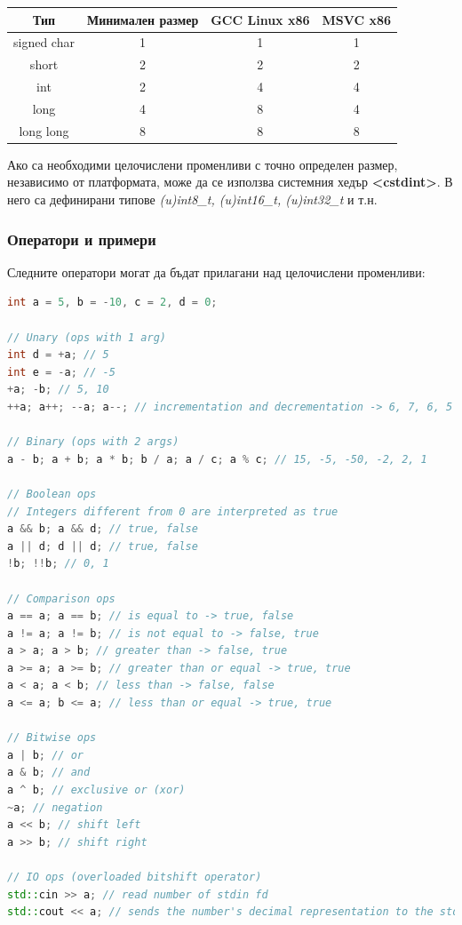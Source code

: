\documentclass[fleqn,12pt]{article}
\begin{document}
\begin{tabular}{ |c|c|c|c| } 
\hline
Тип & Минимален размер & GCC Linux x86 & MSVC x86 \\ 
\hline
signed char & 1 & 1 & 1 \\ 
\hline
short & 2 & 2 & 2 \\ 
\hline
int & 2 & 4 & 4 \\ 
\hline
long & 4 & 8 & 4 \\ 
\hline
long long & 8 & 8 & 8 \\ 
\hline
\end{tabular}

Ако са необходими целочислени променливи с точно определен размер, независимо от платформата, може да се използва системния хедър \textbf{<cstdint>}. 
В него са дефинирани типове \textit{(u)int8\_t, (u)int16\_t, (u)int32\_t} и т.н.

\subsubsection{Оператори и примери}

Следните оператори могат да бъдат прилагани над целочислени променливи:

\begin{lstlisting}[language=C++, caption=Integer operators]
int a = 5, b = -10, c = 2, d = 0;

// Unary (ops with 1 arg)
int d = +a; // 5
int e = -a; // -5
+a; -b; // 5, 10
++a; a++; --a; a--; // incrementation and decrementation -> 6, 7, 6, 5

// Binary (ops with 2 args)
a - b; a + b; a * b; b / a; a / c; a % c; // 15, -5, -50, -2, 2, 1

// Boolean ops
// Integers different from 0 are interpreted as true
a && b; a && d; // true, false
a || d; d || d; // true, false
!b; !!b; // 0, 1

// Comparison ops
a == a; a == b; // is equal to -> true, false
a != a; a != b; // is not equal to -> false, true
a > a; a > b; // greater than -> false, true
a >= a; a >= b; // greater than or equal -> true, true
a < a; a < b; // less than -> false, false
a <= a; b <= a; // less than or equal -> true, true

// Bitwise ops
a | b; // or
a & b; // and
a ^ b; // exclusive or (xor)
~a; // negation
a << b; // shift left
a >> b; // shift right

// IO ops (overloaded bitshift operator)
std::cin >> a; // read number of stdin fd
std::cout << a; // sends the number's decimal representation to the stdout fd
\end{lstlisting}
\end{document}
